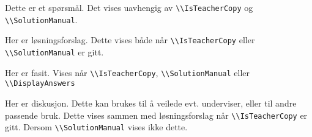 \bpa
  \bppa
    Dette er et spørsmål. Det vises uavhengig av \lstinline{\\IsTeacherCopy} og \lstinline{\\SolutionManual}.
    \begin{solution}
      Her er løsningsforslag. Dette vises både når \lstinline{\\IsTeacherCopy} eller \lstinline{\\SolutionManual} er gitt.
    \end{solution}
    \begin{answer}
      Her er fasit. Vises når \lstinline{\\IsTeacherCopy}, \lstinline{\\SolutionManual} eller \lstinline{\\DisplayAnswers}
    \end{answer}
    \begin{direction}
      Her er diskusjon. Dette kan brukes til å veilede evt. underviser, eller til andre passende bruk. Dette vises sammen med løsningsforslag når \lstinline{\\IsTeacherCopy} er gitt. Dersom \lstinline{\\SolutionManual} vises ikke dette.
    \end{direction}
  \epp
\epa
